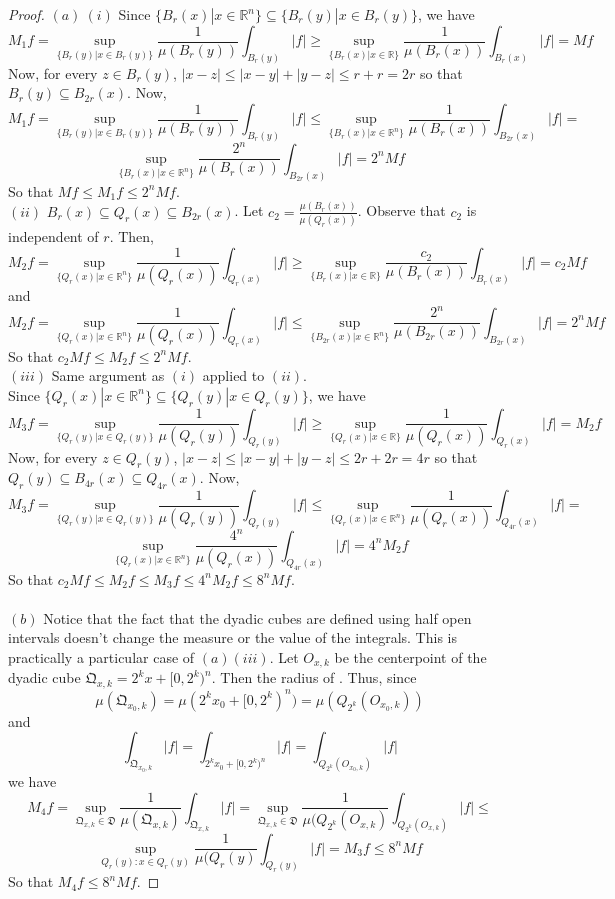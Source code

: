 \documentclass[12pt]{article}
\begin{document}
\begin{proof}
  $(a)\ (i)$ Since $\{B_r(x) | x \in \mathbb{R}^n\} \subseteq \{B_r(y) | x  \in B_r(y)\}$, we have
  $$M_1f = \sup_{\{B_r(y) | x  \in B_r(y)\}} \dfrac{1}{\mu(B_r(y))} \int_{B_r(y)} |f| \ge \sup_{\{B_r(x) | x \in \mathbb{R}\}} \dfrac{1}{\mu(B_r(x))} \int_{B_r(x)} |f| = Mf$$
  Now, for every $z \in B_r(y)$, $|x - z| \le |x - y| + |y - z| \le r + r = 2r$ so that $B_r(y) \subseteq B_{2r}(x)$. Now,
  $$M_1f = \sup_{\{B_r(y) | x  \in B_r(y)\}} \dfrac{1}{\mu(B_r(y))} \int_{B_r(y)} |f| \le \sup_{\{B_r(x) | x  \in \mathbb{R}^n\}} \dfrac{1}{\mu(B_r(x))} \int_{B_{2r}(x)} |f| =$$ $$\sup_{\{B_r(x) | x  \in \mathbb{R}^n\}} \dfrac{2^n}{\mu(B_r(x))} \int_{B_{2r}(x)} |f| = 2^n Mf$$
  So that $Mf \le M_1f \le 2^n Mf$.\\
  $(ii)$ $B_r(x) \subseteq Q_r(x) \subseteq B_{2r}(x)$. Let $c_2 = \frac{\mu(B_r(x))}{\mu(Q_r(x))}$. Observe that $c_2$ is independent of $r$. Then,
  $$M_2f = \sup_{\{Q_r(x) | x  \in \mathbb{R}^n\}} \dfrac{1}{\mu(Q_r(x))} \int_{Q_r(x)} |f| \ge \sup_{\{B_r(x) | x \in \mathbb{R}\}} \dfrac{c_2}{\mu(B_r(x))} \int_{B_r(x)} |f| = c_2Mf$$
  and
  $$M_2f = \sup_{\{Q_r(x) | x  \in \mathbb{R}^n\}} \dfrac{1}{\mu(Q_r(x))} \int_{Q_r(x)} |f| \le \sup_{\{B_{2r}(x) | x  \in \mathbb{R}^n\}} \dfrac{2^n}{\mu(B_{2r}(x))} \int_{B_{2r}(x)} |f| = 2^n Mf$$
  So that $c_2Mf \le M_2f \le 2^n Mf$.\\
  $(iii)$ Same argument as $(i)$ applied to $(ii)$.\\
  Since $\{Q_r(x) | x \in \mathbb{R}^n\} \subseteq \{Q_r(y) | x  \in Q_r(y)\}$, we have
  $$M_3f = \sup_{\{Q_r(y) | x  \in Q_r(y)\}} \dfrac{1}{\mu(Q_r(y))} \int_{Q_r(y)} |f| \ge \sup_{\{Q_r(x) | x \in \mathbb{R}\}} \dfrac{1}{\mu(Q_r(x))} \int_{Q_r(x)} |f| = M_2f$$
  Now, for every $z \in Q_r(y)$, $|x - z| \le |x - y| + |y - z| \le 2r + 2r = 4r$ so that $Q_r(y) \subseteq B_{4r}(x) \subseteq Q_{4r}(x)$. Now,
  $$M_3f = \sup_{\{Q_r(y) | x  \in Q_r(y)\}} \dfrac{1}{\mu(Q_r(y))} \int_{Q_r(y)} |f| \le \sup_{\{Q_r(x) | x  \in \mathbb{R}^n\}} \dfrac{1}{\mu(Q_r(x))} \int_{Q_{4r}(x)} |f| =$$ $$\sup_{\{Q_r(x) | x  \in \mathbb{R}^n\}} \dfrac{4^n}{\mu(Q_r(x))} \int_{Q_{4r}(x)} |f| = 4^n M_2f$$
  So that $c_2Mf \le M_2f \le M_3f \le 4^nM_2f \le 8^n Mf$.\\\\
  $(b)$ Notice that the fact that the dyadic cubes are defined using half open intervals  doesn't change the measure or the value of the integrals. This is practically a particular case of $(a)(iii)$. Let $O_{x, k}$ be the centerpoint of the dyadic cube $\mathfrak{Q}_{x, k} = 2^k x + [0, 2^k)^n$. Then the  radius of . Thus, since $$\mu(\mathfrak{Q}_{x_0, k}) = \mu(2^k x_0 + [0, 2^k)^n) = \mu(Q_{2^k}(O_{x_0, k}))$$
  and
  $$\int_{\mathfrak{Q}_{x_0, k}} |f| = \int_{2^k x_0 + [0, 2^k)^n} |f| = \int_{Q_{2^k}(O_{x_0, k})} |f|$$
  we have
  $$M_4f = \sup_{\mathfrak{Q}_{x, k} \in \mathfrak{D}} \dfrac{1}{\mu(\mathfrak{Q}_{x, k})} \int_{\mathfrak{Q}_{x, k}} |f| = \sup_{\mathfrak{Q}_{x, k} \in \mathfrak{D}} \dfrac{1}{\mu(Q_{2^k}(O_{x, k})} \int_{Q_{2^k}(O_{x, k})} |f| \le$$
  $$\sup_{Q_{r}(y) : x  \in  Q_r(y)} \dfrac{1}{\mu(Q_{r}(y)} \int_{Q_{r}(y)} |f| = M_3f \le 8^nMf$$
  So that $M_4f \le 8^nMf$.
\end{proof}
\end{document}
